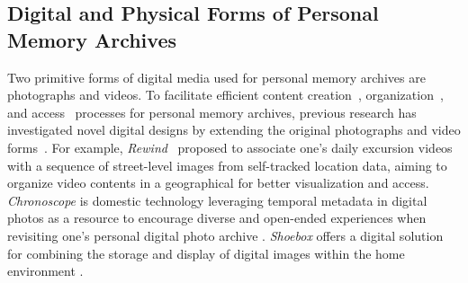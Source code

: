 \subsection{Digital and Physical Forms of Personal Memory Archives}
Two primitive forms of digital media used for personal memory archives are photographs and videos. 
To facilitate efficient content creation~\cite{mayer2009establishing, somerville2011recuerdos, dobbins2014creating}, organization~\cite{neumayer2005content, runardotter2009organizing}, and access~\cite{addis2010100, beigl2001mediacups} processes for personal memory archives, previous research has investigated novel digital designs by extending the original photographs and video forms~\cite{garde2011digital, potter2010embodied, mezaris2018personal, hoskins2017restless,10.1145/3532106.3533501}.
For example, \textit{Rewind}~\cite{10.1145/3287069} proposed to associate one's daily excursion videos with a sequence of street-level images from self-tracked location data, aiming to organize video contents in a geographical for better visualization and access.
\textit{Chronoscope} is domestic technology leveraging temporal metadata in digital photos as a resource to encourage diverse and open-ended experiences when revisiting one's personal digital photo archive \cite{10.1145/3322276.3322301}. 
\emph{Shoebox} offers a digital solution for combining the storage and display of digital images within the home environment \cite{10.1145/1517664.1517678}.

